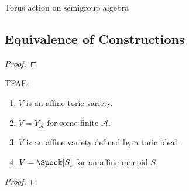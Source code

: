 \begin{definition}
  \label{torActOnAlg}

  Torus action on semigroup algebra
\end{definition}


\subsection{Equivalence of Constructions}


\begin{lemma}
  \label{lmm:1-1-16}
\end{lemma}
\begin{proof}

\end{proof}


\begin{theorem}
  \label{thm:1-1-17}
  TFAE:
  \begin{enumerate}
    \item $V$ is an affine toric variety.
    \item $V = Y_{\mathcal A}$ for some finite $\mathcal A$.
    \item $V$ is an affine variety defined by a toric ideal.
    \item $V = \Spec \Bbbk[S]$ for an affine monoid $S$.
  \end{enumerate}
\end{theorem}
\begin{proof}

\end{proof}
